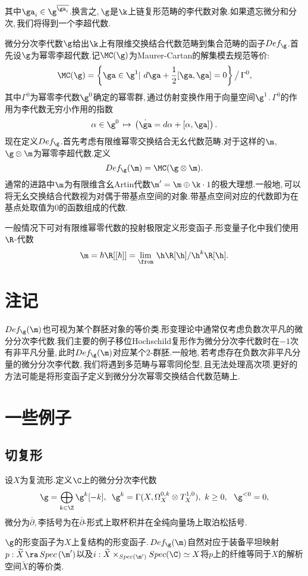 其中$\ga_i\in \g^{\overline{\ga_i}}$.换言之,\,$\g$是$\k$上链复形范畴的李代数对象.如果遗忘微分和分次,\,我们将得到一个李超代数.

微分分次李代数$\g$给出$\k$上有限维交换结合代数范畴到集合范畴的函子$Def_{\g}$.首先设$\g$为幂零李超代数.记$\MC(\g)$为Maurer-Cartan的解集模去规范等价:\,
 $$\MC(\g)=\left\{\ga\in \g^1| \,\,d\ga+{1\over  2}[\ga,\ga]=0\right\}\big/\,
  \Gamma^0,$$
其中$\Gamma^0$为幂零李代数$\g^0$确定的幂零群,\,通过仿射变换作用于向量空间$\g^1$.\,$\Gamma^0$的作用为李代数无穷小作用的指数
$$\alpha\in \g^0\,\mapsto \,\left(\dot\ga=d\alpha+[\alpha,\ga]\right).$$
现在定义$Def_\g$.首先考虑有限维幂零交换结合无幺代数范畴.对于这样的$\m$,\,\\$\g\otimes \m$为幂零李超代数.定义
$$Def_\g(\m)=\MC(\g\otimes \m).$$
通常的进路中$\m$为有限维含幺Artin代数$\m'=\m\oplus 
   \k\cdot {\rm 1}$的极大理想.一般地,\,可以将无幺交换结合代数视为对偶于带基点空间的对象.带基点空间对应的代数即为在基点处取值为$0$的函数组成的代数.

一般情况下可对有限维幂零代数的投射极限定义形变函子.形变量子化中我们使用$\R$-代数
$$\m=\hbar\R[[\hbar]]=\lim_{\from}\,\h\R[\h]/\h^k\R[\h].$$



\section{注记}
$Def_\g(\m)$也可视为某个群胚对象的等价类.形变理论中通常仅考虑负数次平凡的微分分次李代数.我们主要的例子移位Hochschild复形作为微分分次李代数时在$-1$次有非平凡分量,\,此时$Def_\g(\m)$对应某个$2$-群胚.一般地,\,若考虑存在负数次非平凡分量的微分分次李代数,\,我们将遇到多范畴与幂零同伦型,\,且无法处理高次项.更好的方法可能是将形变函子定义到微分分次幂零交换结合代数范畴上.



\section{一些例子}

\subsection{切复形}
设$X$为复流形.定义$\C$上的微分分次李代数
$$\g=\bigoplus_{k\in \Z} \g^k[-k],\,\,\,
  \g^k=\Gamma(X,\Omega^{0,k}_X\otimes T^{1,0}_X),\,\,
  k\ge 0,\,\,\,\,\g^{<0}=0,$$
微分为$\overline{\partial}$,\,李括号为在$\overline{\partial}$-形式上取杯积并在全纯向量场上取泊松括号.

$\g$的形变函子为$X$上复结构的形变函子.\,$Def_\g(\m)$自然对应于装备平坦映射$p:\widetilde{X}\,\ra\, Spec\,(\m')$以及$i:
     \widetilde{X}\times_{Spec(\m')} Spec( \C)\simeq X$将$p$上的纤维等同于$X$的解析空间$\widetilde{X}$的等价类.

